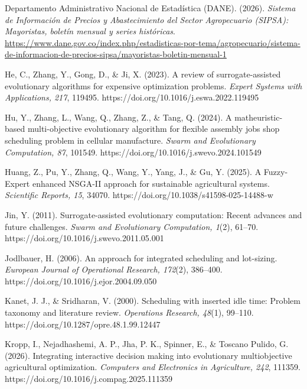 \documentclass[]{interact}
\begin{document}
\begin{thebibliography}{}
Departamento Administrativo Nacional de Estad\'istica (DANE). (2026). \emph{Sistema de Informaci\'on de Precios y Abastecimiento del Sector Agropecuario (SIPSA): Mayoristas, bolet\'in mensual y series hist\'oricas}. \url{https://www.dane.gov.co/index.php/estadisticas-por-tema/agropecuario/sistema-de-informacion-de-precios-sipsa/mayoristas-boletin-mensual-1}

He, C., Zhang, Y., Gong, D., \& Ji, X. (2023). A review of surrogate-assisted evolutionary algorithms for expensive optimization problems. \emph{Expert Systems with Applications, 217}, 119495. https://doi.org/10.1016/j.eswa.2022.119495

Hu, Y., Zhang, L., Wang, Q., Zhang, Z., \& Tang, Q. (2024). A matheuristic-based multi-objective evolutionary algorithm for flexible assembly jobs shop scheduling problem in cellular manufacture. \emph{Swarm and Evolutionary Computation, 87}, 101549. https://doi.org/10.1016/j.swevo.2024.101549

Huang, Z., Pu, Y., Zhang, Q., Wang, Y., Yang, J., \& Gu, Y. (2025). A Fuzzy-Expert enhanced NSGA-II approach for sustainable agricultural systems. \emph{Scientific Reports, 15}, 34070. https://doi.org/10.1038/s41598-025-14488-w

Jin, Y. (2011). Surrogate-assisted evolutionary computation: Recent advances and future challenges. \emph{Swarm and Evolutionary Computation, 1}(2), 61--70. https://doi.org/10.1016/j.swevo.2011.05.001

Jodlbauer, H. (2006). An approach for integrated scheduling and lot-sizing. \emph{European Journal of Operational Research, 172}(2), 386--400. https://doi.org/10.1016/j.ejor.2004.09.050

Kanet, J. J., \& Sridharan, V. (2000). Scheduling with inserted idle time: Problem taxonomy and literature review. \emph{Operations Research, 48}(1), 99--110. https://doi.org/10.1287/opre.48.1.99.12447

Kropp, I., Nejadhashemi, A. P., Jha, P. K., Spinner, E., \& Toscano Pulido, G. (2026). Integrating interactive decision making into evolutionary multiobjective agricultural optimization. \emph{Computers and Electronics in Agriculture, 242}, 111359. https://doi.org/10.1016/j.compag.2025.111359


\end{thebibliography}
\end{document}
